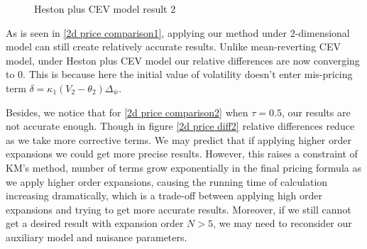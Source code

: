 \begin{figure}[ht]
  \centering
  \hfill
  \caption{Heston plus CEV model result 2}
\end{figure}

As is seen in \ref{2d price comparison1}, applying our method under 2-dimensional model can still create relatively accurate results. Unlike mean-reverting CEV model, under Heston plus CEV model our relative differences are now converging to 0. This is because here the initial value of volatility doesn't enter mis-pricing term $\delta = \kappa_1(V_2-\theta_2) \Delta_{\bar{w}}$.

Besides, we notice that for \ref{2d price comparison2} when $\tau=0.5$, our results are not accurate enough. Though in figure \ref{2d price diff2} relative differences reduce as we take more corrective terms. We may predict that if applying higher order expansions we could get more precise results. However, this raises a constraint of KM's method, number of terms grow exponentially in the final pricing formula as we apply higher order expansions, causing the running time of calculation increasing dramatically, which is a trade-off between applying high order expansions and trying to get more accurate results. Moreover, if we still cannot get a desired result with expansion order $N>5$, we may need to reconsider our auxiliary model and nuisance parameters.


